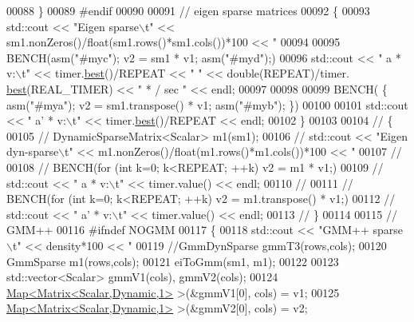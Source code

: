 \begin{DoxyCode}
{00088     \}
00089 \textcolor{preprocessor}{    #endif}
00090 
00091     \textcolor{comment}{// eigen sparse matrices}
00092     \{
00093       std::cout << \textcolor{stringliteral}{"Eigen sparse\(\backslash\)t"} << sm1.nonZeros()/float(sm1.rows()*sm1.cols())*100 << \textcolor{stringliteral}{"%
00094 
00095       BENCH(\textcolor{keyword}{asm}(\textcolor{stringliteral}{"#myc"}); v2 = sm1 * v1; \textcolor{keyword}{asm}(\textcolor{stringliteral}{"#myd"});)
00096       std::cout << \textcolor{stringliteral}{"   a * v:\(\backslash\)t"} << timer.\hyperlink{class_eigen_1_1_bench_timer_ae8b673b0fa356d3432c7a65c79e8af0e}{best}()/REPEAT << \textcolor{stringliteral}{"  "} << double(REPEAT)/timer.
      \hyperlink{class_eigen_1_1_bench_timer_ae8b673b0fa356d3432c7a65c79e8af0e}{best}(REAL\_TIMER) << \textcolor{stringliteral}{" * / sec "} << endl;
00097 
00098 
00099       BENCH( \{ \textcolor{keyword}{asm}(\textcolor{stringliteral}{"#mya"}); v2 = sm1.transpose() * v1; \textcolor{keyword}{asm}(\textcolor{stringliteral}{"#myb"}); \})
00100 
00101       std::cout << \textcolor{stringliteral}{"   a' * v:\(\backslash\)t"} << timer.\hyperlink{class_eigen_1_1_bench_timer_ae8b673b0fa356d3432c7a65c79e8af0e}{best}()/REPEAT << endl;
00102     \}
00103 
00104 \textcolor{comment}{//     \{}
00105 \textcolor{comment}{//       DynamicSparseMatrix<Scalar> m1(sm1);}
00106 \textcolor{comment}{//       std::cout << "Eigen dyn-sparse\(\backslash\)t" << m1.nonZeros()/float(m1.rows()*m1.cols())*100 << "%
00107 \textcolor{comment}{//}
00108 \textcolor{comment}{//       BENCH(for (int k=0; k<REPEAT; ++k) v2 = m1 * v1;)}
00109 \textcolor{comment}{//       std::cout << "   a * v:\(\backslash\)t" << timer.value() << endl;}
00110 \textcolor{comment}{//}
00111 \textcolor{comment}{//       BENCH(for (int k=0; k<REPEAT; ++k) v2 = m1.transpose() * v1;)}
00112 \textcolor{comment}{//       std::cout << "   a' * v:\(\backslash\)t" << timer.value() << endl;}
00113 \textcolor{comment}{//     \}}
00114 
00115     \textcolor{comment}{// GMM++}
00116 \textcolor{preprocessor}{    #ifndef NOGMM}
00117     \{
00118       std::cout << \textcolor{stringliteral}{"GMM++ sparse\(\backslash\)t"} << density*100 << \textcolor{stringliteral}{"%
00119       \textcolor{comment}{//GmmDynSparse  gmmT3(rows,cols);}
00120       GmmSparse m1(rows,cols);
00121       eiToGmm(sm1, m1);
00122 
00123       std::vector<Scalar> gmmV1(cols), gmmV2(cols);
00124       \hyperlink{group___core___module_class_eigen_1_1_map}{Map<Matrix<Scalar,Dynamic,1>} >(&gmmV1[0], cols) = v1;
00125       \hyperlink{group___core___module_class_eigen_1_1_map}{Map<Matrix<Scalar,Dynamic,1>} >(&gmmV2[0], cols) = v2;
}}}}
\end{DoxyCode}
